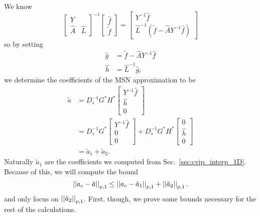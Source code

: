 We know
%
\begin{equation}
    \begin{bmatrix} Y & \\ \widehat{A} & \widehat{L} \end{bmatrix}^{-1}
    \begin{bmatrix} \hat{f} \\ \tilde{f} \end{bmatrix} = 
    \begin{bmatrix} Y^{-1}\hat{f} \\
        \widehat{L}^{-1}(\tilde{f} - \widehat{A}Y^{-1}\hat{f})
    \end{bmatrix}
\end{equation}
%
so by setting
%
\begin{align}
    \hat{g} &= \tilde{f} - \widehat{A}Y^{-1}\hat{f} \nonumber\\
    \hat{h} &= \widehat{L}^{-1}\hat{g},
\end{align}
%
we determine the coefficients of the MSN approximation to be
%
\begin{align}
    \tilde{a} &= D_{s}^{-1}G^{*}H^{*}
        \begin{bmatrix} Y^{-1}\hat{f} \\ \hat{h} \\ 0
        \end{bmatrix} \nonumber\\
    &= D_{s}^{-1}G^{*}\begin{bmatrix} Y^{-1}\hat{f} \\ 0 \\ 0
        \end{bmatrix}
    + D_{s}^{-1}G^{*}H^{*} \begin{bmatrix} 0 \\ \hat{h} \\ 0
        \end{bmatrix} \nonumber\\
    &= \tilde{a}_{1} + \tilde{a}_{2}.
\end{align}
%
Naturally $\tilde{a}_{1}$ are the coefficients we computed from
Sec.~\ref{sec:cvip_interp_1D}.
Because of this, we will compute the bound
%
\begin{equation}
    \left| \left| a_{c}-\tilde{a} \right| \right|_{p,1} \le \left| \left| a_{c}-\tilde{a}_{1} \right| \right|_{p,1}
        + \left| \left| \tilde{a}_{2} \right| \right|_{p,1}.
\end{equation}
%
and only focus on $\left| \left| \tilde{a}_{2} \right| \right|_{p,1}$.
First, though, we prove some bounds necessary for the rest of the
calculations.

